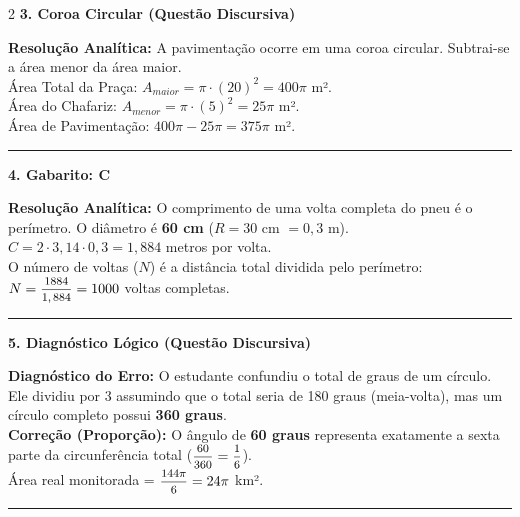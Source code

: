 \documentclass[11pt, a4paper]{article}
\begin{document}
\begin{multicols*}{2}
\textbf{3. Coroa Circular (Questão Discursiva)}
\begin{boxresponda}
\textbf{Resolução Analítica:} A pavimentação ocorre em uma coroa circular. Subtrai-se a área menor da área maior.
\\[0.1cm]
Área Total da Praça: $A_{maior} = \pi \cdot (20)^2 = 400\pi$ m².
\\[0.1cm]
Área do Chafariz: $A_{menor} = \pi \cdot (5)^2 = 25\pi$ m².
\\[0.1cm]
Área de Pavimentação: $400\pi - 25\pi = 375\pi$ m².
\end{boxresponda}

\vspace{0.4cm}
\noindent\textcolor{CorLinha}{\rule{\linewidth}{0.5pt}} 
\vspace{0.2cm}

\textbf{4. Gabarito: \textcolor{CorGabarito}{C}}
\begin{boxresponda}
\textbf{Resolução Analítica:} O comprimento de uma volta completa do pneu é o perímetro. O diâmetro é \textbf{60 cm} ($R = 30$ cm $= 0,3$ m).
\\[0.1cm]
$C = 2 \cdot 3,14 \cdot 0,3 = 1,884$ metros por volta.
\\[0.1cm]
O número de voltas ($N$) é a distância total dividida pelo perímetro: $N = \mfrac{1884}{1,884} = 1000$ voltas completas.
\end{boxresponda}

\vspace{0.4cm}
\noindent\textcolor{CorLinha}{\rule{\linewidth}{0.5pt}} 
\vspace{0.2cm}

\textbf{5. Diagnóstico Lógico (Questão Discursiva)}
\begin{boxresponda}
\textbf{Diagnóstico do Erro:} O estudante confundiu o total de graus de um círculo. Ele dividiu por 3 assumindo que o total seria de 180 graus (meia-volta), mas um círculo completo possui \textbf{360 graus}.
\\[0.1cm]
\textbf{Correção (Proporção):} O ângulo de \textbf{60 graus} representa exatamente a sexta parte da circunferência total ($\mfrac{60}{360} = \mfrac{1}{6}$).
\\[0.1cm]
Área real monitorada = $\mfrac{144\pi}{6} = 24\pi$ km².
\end{boxresponda}

\vspace{0.4cm}
\noindent\textcolor{CorLinha}{\rule{\linewidth}{0.5pt}} 
\vspace{0.2cm}


\end{multicols*}
\end{document}
